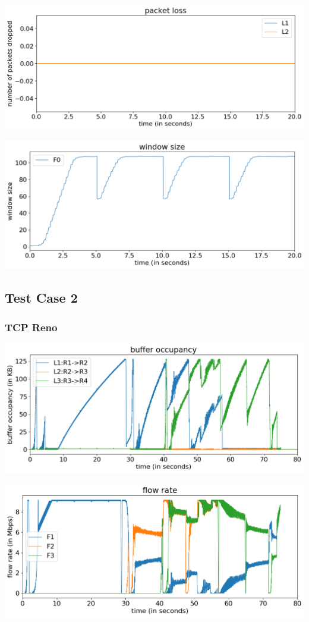 \documentclass{article}
\begin{document}
\includegraphics[width = \textwidth]{"test_case1_fast packet loss"}

\includegraphics[width = \textwidth]{"test_case1_fast window size"}



\subsection{Test Case 2}

\subsubsection{TCP Reno}

\includegraphics[width = \textwidth]{"test_case2_reno buffer occupancy"}

\includegraphics[width = \textwidth]{"test_case2_reno flow rate"}
\end{document}
